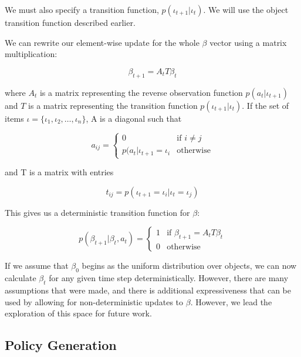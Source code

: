 \documentclass[conference]{IEEEtran}
\begin{document}
We must also specify a transition function, $p(\iota_{t+1} | \iota_t)$. We will use the object transition function described earlier. 

We can rewrite our element-wise update for the whole $\beta$ vector using a matrix multiplication: 


$$\beta_{t+1} = A_{t}T \beta_{t}$$


where $A_{t}$ is a matrix representing the reverse observation function $p(a_{t} | \iota_{t+1})$ and $T$ is a matrix representing the transition function $p(\iota_{t+1}|\iota_{t})$.  If the set of items $\mathcal{\iota} = \{ \iota_1, \iota_2, \ldots, \iota_n\}$, A is a diagonal such that

\begin{equation*}
	a_{ij} = \begin{cases}
		0 & \text{if } i \ne j \\
		p(a_t | \iota_{t+1} = \iota_i & \text{otherwise}
	\end{cases}
\end{equation*}

and T is a matrix with entries

\begin{equation*}
	t_{ij} = p(\iota_{t+1} = \iota_i | \iota_{t} = \iota_j)
\end{equation*}
		


This gives us a deterministic transition function for $\beta$: 

\begin{equation}
	p(\beta_{t+1} | \beta_t, a_t) = \begin{cases}
		1 & \text{if } \beta_{t+1} = A_t T \beta_t \\
		0 & \text{otherwise}
	\end{cases}
\end{equation}

If we assume that $\beta_0$ begins as the uniform distribution over objects, we can now calculate $\beta_t$ for any given time step deterministically. However, there are many assumptions that were made, and there is additional expressiveness that can be used by allowing for non-deterministic updates to $\beta$. However, we lead the exploration of this space for future work. 

\subsection{Policy Generation}
\end{document}
